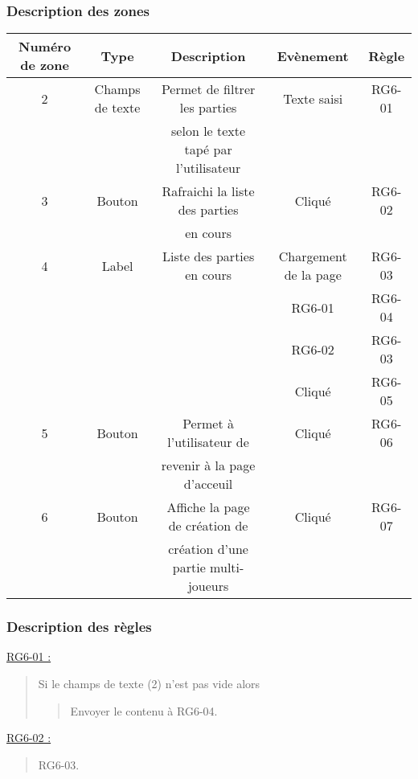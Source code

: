 \documentclass{report}
\begin{document}
		\subsubsection{Description des zones}

			\begin{tabular}{|c|c|c|c|c|} \hline
				Numéro de zone & Type  & Description & Evènement &	Règle \\\hline
				2 & Champs de texte & Permet de filtrer les parties & Texte saisi & RG6-01 \\
				  &                 & selon le texte tapé par l'utilisateur & & \\\hline
				3 & Bouton & Rafraichi la liste des parties & Cliqué & RG6-02 \\
				  &        & en cours & & \\\hline
				4 & Label & Liste des parties en cours & Chargement de la page & RG6-03 \\
				  &       &                            & RG6-01 & RG6-04 \\
				  &       &                            & RG6-02 & RG6-03 \\
				  &       &                            & Cliqué & RG6-05 \\\hline
				5 & Bouton & Permet à l'utilisateur de & Cliqué & RG6-06 \\
				  &        & revenir à la page d'acceuil & & \\\hline
				6 & Bouton & Affiche la page de création de & Cliqué & RG6-07 \\
				  &        & création d'une partie multi-joueurs & & \\\hline    
			\end{tabular}

		\subsubsection{Description des règles}

			\underline{RG6-01 :}
				\begin{quote}
					Si le champs de texte (2) n'est pas vide alors
					\begin{quote}	
						Envoyer le contenu à RG6-04.\\
					\end{quote}					
				\end{quote}	
		
				
			\underline{RG6-02 :}
				\begin{quote}	
					RG6-03.\\
				\end{quote}
	
\end{document}
